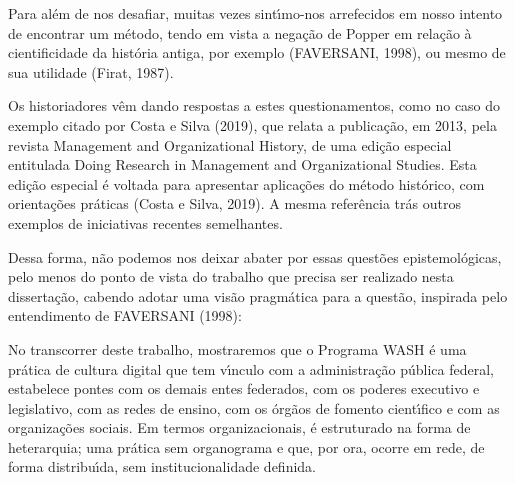 \documentclass[
12pt,		%
openright,	%
twoside,  %
a4paper,			%
chapter=TITLE,		%
english,			%
french,				%
spanish,			%
brazil				%
]{USPSC-classe/USPSC}
\begin{document}
Para al\'em de nos desafiar, muitas vezes sint\'{\i}mo-nos arrefecidos em nosso intento de \textquotedbl encontrar um m\'etodo\textquotedbl , tendo em vista a nega\c{c}\~ao de Popper em rela\c{c}\~ao \`a cientificidade da hist\'oria antiga, por exemplo (FAVERSANI, 1998), ou mesmo de sua utilidade (Firat, 1987).




Os historiadores v\^em dando respostas a estes questionamentos, como no caso do exemplo citado por  Costa e Silva (2019), que relata a publica\c{c}\~ao, em 2013, pela revista \textquotedbl Management and Organizational History\textquotedbl , de uma edi\c{c}\~ao especial entitulada \textquotedbl Doing Research in Management and Organizational Studies\textquotedbl . Esta edi\c{c}\~ao especial \'e voltada para apresentar aplica\c{c}\~oes do m\'etodo hist\'orico, com orienta\c{c}\~oes pr\'aticas  (Costa e Silva, 2019). A mesma refer\^encia tr\'as outros exemplos de iniciativas recentes semelhantes.




Dessa forma, n\~ao podemos nos deixar abater por essas quest\~oes epistemol\'ogicas, pelo menos do ponto de vista do trabalho que precisa ser realizado nesta disserta\c{c}\~ao, cabendo adotar uma vis\~ao pragm\'atica para a quest\~ao, inspirada pelo entendimento de FAVERSANI (1998):





\noindent\begin{center}\mbox{\centering{}}\end{center}


No transcorrer deste trabalho, mostraremos que o Programa WASH \'e uma pr\'atica de cultura digital que tem v\'{\i}nculo com a administra\c{c}\~ao p\'ublica federal, estabelece pontes com os demais entes federados, com os poderes executivo e legislativo, com as redes de ensino, com os \'org\~aos de fomento cient\'{\i}fico e com as organiza\c{c}\~oes sociais. Em termos organizacionais, \'e estruturado na forma de heterarquia; uma pr\'atica sem organograma e que, por ora, ocorre em rede, de forma distribu\'{\i}da, sem institucionalidade definida.
\end{document}
